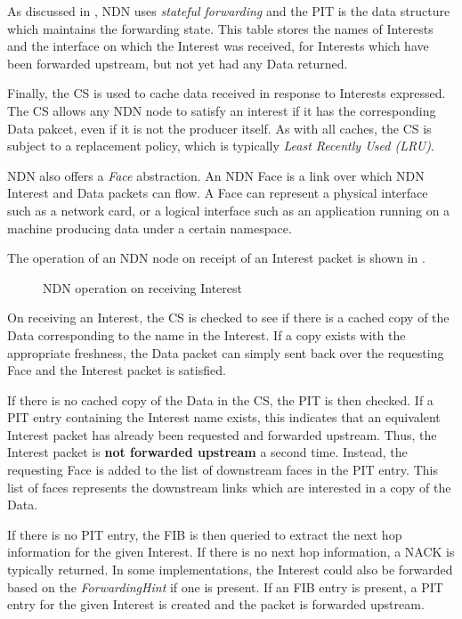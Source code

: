 As discussed in , NDN uses \textit{stateful forwarding} and the PIT is the data structure which maintains the forwarding state. This table stores the names of Interests and the interface on which the Interest was received, for Interests which have been forwarded upstream, but not yet had any Data returned.

Finally, the CS is used to cache data received in response to Interests expressed. The CS allows any NDN node to satisfy an interest if it has the corresponding Data pakcet, even if it is not the producer itself. As with all caches, the CS is subject to a replacement policy, which is typically \textit{Least Recently Used (LRU)}.

NDN also offers a \textit{Face} abstraction. An NDN Face is a link over which NDN Interest and Data packets can flow. A Face can represent a physical interface such as a network card, or a logical interface such as an application running on a machine producing data under a certain namespace.


The operation of an NDN node on receipt of an Interest packet is shown in .  

\begin{figure}[H]
    \centering
    \caption{NDN operation on receiving Interest}
    \label{fig:ndn-on-interest}
\end{figure}

On receiving an Interest, the CS is checked to see if there is a cached copy of the Data corresponding to the name in the Interest. If a copy exists with the appropriate freshness, the Data packet can simply sent back over the requesting Face and the Interest packet is satisfied. 

If there is no cached copy of the Data in the CS, the PIT is then checked. If a PIT entry containing the Interest name exists, this indicates that an equivalent Interest packet has already been requested and forwarded upstream. Thus, the Interest packet is \textbf{not forwarded upstream} a second time. Instead, the requesting Face is added to the list of downstream faces in the PIT entry. This list of faces represents the downstream links which are interested in a copy of the Data.

If there is no PIT entry, the FIB is then queried to extract the next hop information for the given Interest. If there is no next hop information, a NACK is typically returned. In some implementations, the Interest could also be forwarded based on the \textit{ForwardingHint} if one is present. If an FIB entry is present, a PIT entry for the given Interest is created and the packet is forwarded upstream. 

